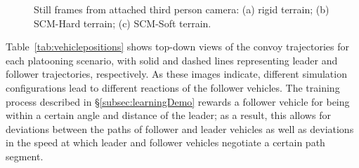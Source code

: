 \documentclass[12pt,twocolumn]{article}
\begin{document}
\begin{figure}
\begin{subfigure}{0.33\textwidth}
        \caption{} \label{fig:soft13}
    \end{subfigure}%
    \caption{Still frames from attached third person camera: (a) rigid terrain; (b) SCM-Hard terrain; (c) SCM-Soft terrain.}   
    \label{fig:simscreenshots}
\end{figure}

Table~\ref{tab:vehiclepositions} shows top-down views of the convoy trajectories for each platooning scenario, with solid and dashed lines representing leader and follower trajectories, respectively.
As these images indicate, different simulation configurations lead to different reactions of the follower vehicles. The training process described in \S\ref{subsec:learningDemo} rewards a follower vehicle for being within a certain angle and distance of the leader; as a result, this allows for deviations between the paths of follower and leader vehicles as well as deviations in the speed at which leader and follower vehicles negotiate a certain path segment.
\end{document}
